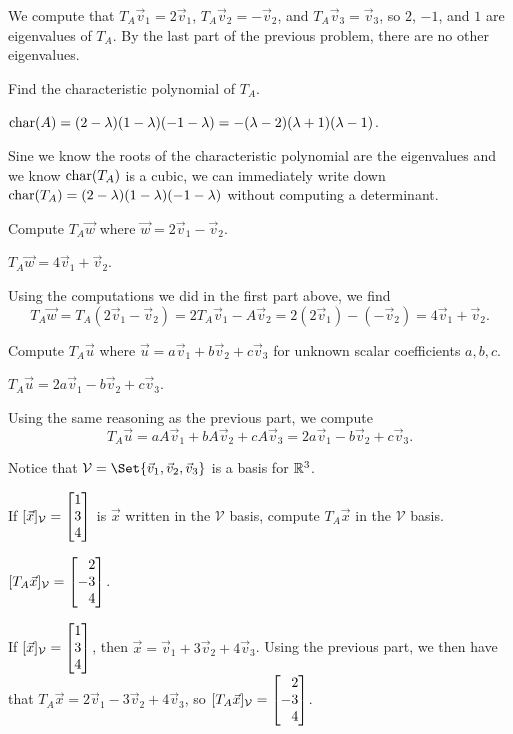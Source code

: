 \documentclass{workbook}
\begin{document}
\begin{slide}
\begin{parts}
\begin{solution}
				We compute that $T_A\vec v_1=2\vec v_1$, $T_A\vec v_2=-\vec v_2$,
				and $T_A\vec v_3=\vec v_3$, so $2$, $-1$, and $1$ are eigenvalues
				of $T_A$. By the last part of the previous problem, there are no
				other eigenvalues.
			\end{solution}
		\item Find the characteristic polynomial of $T_A$.
			\begin{solution}
				$\operatorname{char}(A)=(2-\lambda)(1-\lambda)(-1-\lambda)=-(\lambda-2)(\lambda+1)(\lambda-1)$.

				Sine we know the roots of the characteristic polynomial are the eigenvalues and
				we know $\operatorname{char}(T_A)$ is a cubic, we can immediately write down
				$\operatorname{char}(T_A)=(2-\lambda)(1-\lambda)(-1-\lambda)$ without computing a determinant.
			\end{solution}
		\item Compute $T_A\vec w$ where $\vec w=2\vec v_1-\vec v_2$.
			\begin{solution}
				$T_A\vec w=4\vec v_1+\vec v_2$.

				Using the computations we did in the first part above, we find
				\[
					T_A\vec w
					=T_A(2\vec v_1-\vec v_2)
					=2T_A\vec v_1-A\vec v_2
					=2(2\vec v_1)-(-\vec v_2)
					=4\vec v_1+\vec v_2.
				\]
			\end{solution}
		\item Compute $T_A\vec u$ where $\vec u=a\vec v_1+b\vec v_2+c\vec v_3$ for
			unknown scalar coefficients $a,b,c$.
			\begin{solution}
				$T_A\vec u=2a\vec v_1-b\vec v_2+c\vec v_3$.

				Using the same reasoning as the previous part, we compute
				\[
					T_A\vec u
					=aA\vec v_1+bA\vec v_2+cA\vec v_3
					=2a\vec v_1-b\vec v_2+c\vec v_3.
				\]
			\end{solution}
	\end{parts}
	Notice that $\mathcal V=\Set{\vec v_1,\vec v_2,\vec v_3}$ is a basis for $\mathbb{R}^3$.
	\begin{parts}[resume]
	\item If $[\vec x]_{\mathcal V}=\mat{1\\3\\4}$ is $\vec x$ written in the $\mathcal V$ basis,
		compute $T_A\vec x$ in the $\mathcal V$ basis.
		\begin{solution}
			$[T_A\vec x]_{\mathcal V}=\mat{2\\-3\\4}$.

			If $[\vec x]_{\mathcal V}=\mat{1\\3\\4}$, then
			$\vec x=\vec v_1+3\vec v_2+4\vec v_3$. Using the previous part, we
			then have that $T_A\vec x=2\vec v_1-3\vec v_2+4\vec v_3$, so
			$[T_A\vec x]_{\mathcal V}=\mat{2\\-3\\4}$.
		\end{solution}
	\end{parts}

\end{slide}
\end{document}

